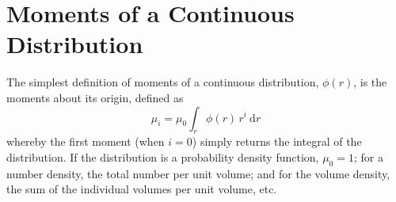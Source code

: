 \documentclass[a4paper,10pt]{article}
\begin{document}




\section{Moments of a Continuous Distribution} \label{sec:mom_of_cont_dist}
The simplest definition of moments of a continuous distribution, $\phi(r)$, is the moments about its origin, defined as
\begin{equation} \label{eqn:mom_about_origin}
\mu_{i} = \mu_{0} \int_{r} \phi(r) \, r^{i} \: \mathrm{d}r
\end{equation}
whereby the first moment (when $i=0$) simply returns the integral of the distribution.  If the distribution is a probability density function, $\mu_0=1$; for a number density, the total number per unit volume; and for the volume density, the sum of the individual volumes per unit volume, etc.
\end{document}
